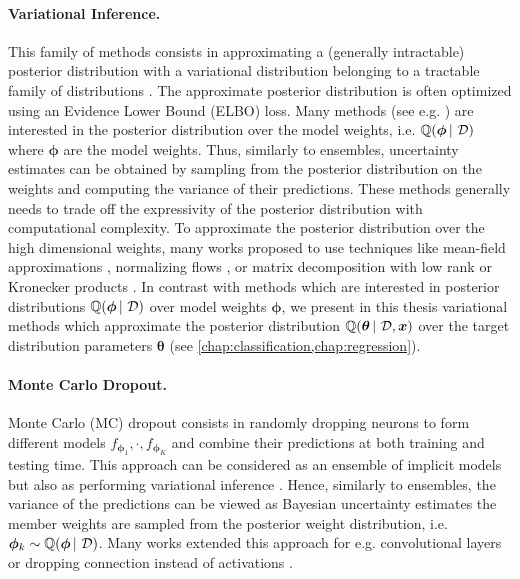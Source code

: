 \paragraph*{Variational Inference.} This family of methods consists in approximating a (generally intractable) posterior distribution with a variational distribution belonging to a tractable family of distributions \cite{blei2017vi}. The approximate posterior distribution is often optimized using an Evidence Lower Bound (ELBO) loss. Many methods (see e.g. \cite{practical-bnn,bayesian-networks,practical_deep_bayesian_principles}) are interested in the posterior distribution over the model weights, i.e. $\operatorname{\mathbb{Q}}(\bm{\phi} \,|\, \operatorname{\mathcal{D}})$ where $\bm{\phi}$ are the model weights. Thus, similarly to ensembles, uncertainty estimates can be obtained by sampling from the posterior distribution on the weights and computing the variance of their predictions. These methods generally needs to trade off the expressivity of the posterior distribution with computational complexity. To approximate the posterior distribution over the high dimensional weights, many works proposed to use techniques like mean-field approximations \citep{practical-bnn,bayesian-networks,practical_deep_bayesian_principles}, normalizing flows \cite{radialflow,Louizos2017}, or matrix decomposition with low rank or Kronecker products \cite{mishkin2018slang,bae2018eigen,zhang2017noisy}. In contrast with methods which are interested in posterior distributions $\operatorname{\mathbb{Q}}(\bm{\phi} \,|\, \operatorname{\mathcal{D}})$ over model weights $\bm{\phi}$, we present in this thesis variational methods which approximate the posterior distribution $\operatorname{\mathbb{Q}}(\bm{\theta} \,|\, \operatorname{\mathcal{D}}, \bm{x})$ over the target distribution parameters $\bm{\theta}$ (see \cref{chap:classification,chap:regression}).

\paragraph*{Monte Carlo Dropout.} Monte Carlo (MC) dropout consists in randomly dropping neurons to form different models $f_{\bm{\phi}_1},\cdot, f_{\bm{\phi}_K}$ and combine their predictions \citep{dropout} at both training and testing time. This approach can be considered as an ensemble of implicit models \citep{abe2022deep} but also as performing variational inference \citep{dropout}. Hence, similarly to ensembles, the variance of the predictions can be viewed as Bayesian uncertainty estimates the member weights are sampled from the posterior weight distribution, i.e. $\bm{\phi}_k \sim \operatorname{\mathbb{Q}}(\bm{\phi} \,|\, \operatorname{\mathcal{D}})$. Many works extended this approach for e.g. convolutional layers \citep{tassi2020bayesian} or dropping connection instead of activations \citep{wan2013dropconnect}.

